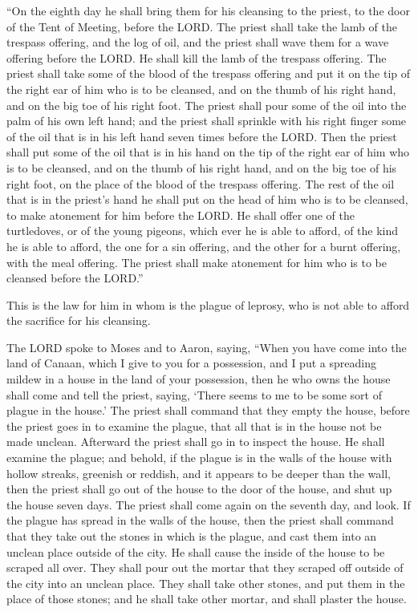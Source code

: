  ``On the eighth day he shall bring them for his
cleansing to the priest, to the door of the Tent of Meeting, before the
LORD.  The priest shall take the lamb of the trespass
offering, and the log of oil, and the priest shall wave them for a wave
offering before the LORD.  He shall kill the lamb of the
trespass offering. The priest shall take some of the blood of the
trespass offering and put it on the tip of the right ear of him who is
to be cleansed, and on the thumb of his right hand, and on the big toe
of his right foot.  The priest shall pour some of the oil
into the palm of his own left hand;  and the priest shall
sprinkle with his right finger some of the oil that is in his left hand
seven times before the LORD.  Then the priest shall put
some of the oil that is in his hand on the tip of the right ear of him
who is to be cleansed, and on the thumb of his right hand, and on the
big toe of his right foot, on the place of the blood of the trespass
offering.  The rest of the oil that is in the priest's
hand he shall put on the head of him who is to be cleansed, to make
atonement for him before the LORD.  He shall offer one of
the turtledoves, or of the young pigeons, which ever he is able to
afford,  of the kind he is able to afford, the one for a
sin offering, and the other for a burnt offering, with the meal
offering. The priest shall make atonement for him who is to be cleansed
before the LORD.''

 This is the law for him in whom is the plague of
leprosy, who is not able to afford the sacrifice for his cleansing.

 The LORD spoke to Moses and to Aaron, saying,
 ``When you have come into the land of Canaan, which I
give to you for a possession, and I put a spreading mildew in a house in
the land of your possession,  then he who owns the house
shall come and tell the priest, saying, `There seems to me to be some
sort of plague in the house.'  The priest shall command
that they empty the house, before the priest goes in to examine the
plague, that all that is in the house not be made unclean. Afterward the
priest shall go in to inspect the house.  He shall
examine the plague; and behold, if the plague is in the walls of the
house with hollow streaks, greenish or reddish, and it appears to be
deeper than the wall,  then the priest shall go out of
the house to the door of the house, and shut up the house seven days.
 The priest shall come again on the seventh day, and
look. If the plague has spread in the walls of the house,
 then the priest shall command that they take out the
stones in which is the plague, and cast them into an unclean place
outside of the city.  He shall cause the inside of the
house to be scraped all over. They shall pour out the mortar that they
scraped off outside of the city into an unclean place. 
They shall take other stones, and put them in the place of those stones;
and he shall take other mortar, and shall plaster the house.

